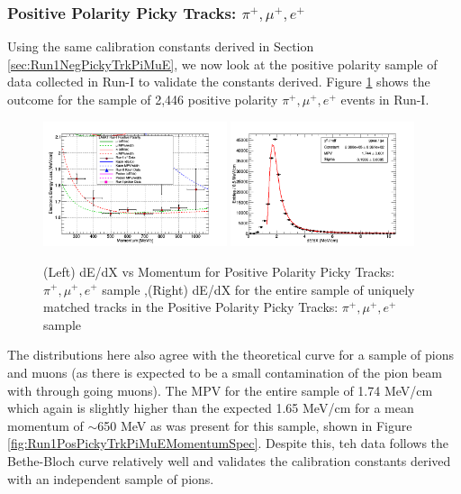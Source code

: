 \subsubsection{Positive Polarity Picky Tracks: $\pi^{+}, \mu^{+}, e^{+}$}\label{sec:Run1PosPickyTrkPiMuE}

Using the same calibration constants derived in Section \ref{sec:Run1NegPickyTrkPiMuE}, we now look at the positive polarity sample of data collected in Run-I to validate the constants derived.  Figure \ref{fig:Run1PosPickyTrkPiMuEResults} shows the outcome for the sample of 2,446 positive polarity  $\pi^{+}, \mu^{+}, e^{+}$ events in Run-I.

\begin{figure}[htb]
\centering
\includegraphics[width=0.48\textwidth]{images/dEdXvsMomentumPosPolRun1FineBin.png}
\includegraphics[width=0.48\textwidth]{images/dEdXPosPolRun1.png}
\caption{(Left) dE/dX vs Momentum for Positive Polarity Picky Tracks: $\pi^{+}, \mu^{+}, e^{+}$ sample ,(Right) dE/dX for the entire sample of uniquely matched tracks in the Positive Polarity Picky Tracks: $\pi^{+}, \mu^{+}, e^{+}$ sample }
\label{fig:Run1PosPickyTrkPiMuEResults}
\end{figure}

The distributions here also agree with the theoretical curve for a sample of pions and muons (as there is expected to be a small contamination of the pion beam with through going muons). The MPV for the entire sample of 1.74 MeV/cm which again is slightly higher than the expected 1.65 MeV/cm for a mean momentum of $\sim$650 MeV as was present for this sample, shown in Figure \ref{fig:Run1PosPickyTrkPiMuEMomentumSpec}. Despite this, teh data follows the Bethe-Bloch curve relatively well and validates the calibration constants derived with an independent sample of pions.

